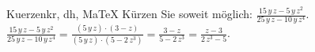 \begin{MAufgabe}{Kuerzen}{kr, dh, MaTeX}
K\"urzen Sie soweit m\"oglich: $\frac{15\, y\, z - 5\, y\, z^2}{25\, y\, z - 10\, y\, z^4}$.\\ 
\ifLsg\MLoesung
\quad $\frac{15\, y\, z - 5\, y\, z^2}{25\, y\, z - 10\, y\, z^4}=\frac{(5\, y\, z)\cdot(3 - z)}{(5\, y\, z)\cdot(5 - 2\, z^3)}=\frac{3 - z}{5 - 2\, z^3}=\frac{z - 3}{2\, z^3 - 5}$.\else\relax\fi
 \end{MAufgabe}